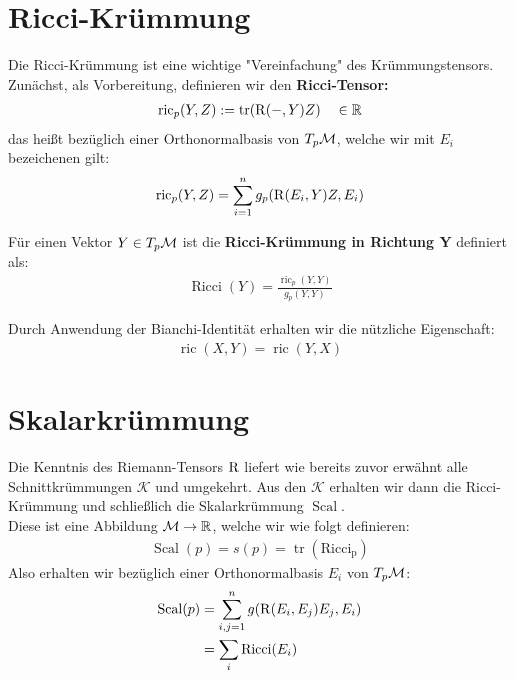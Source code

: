 \section{Ricci-Krümmung}
Die Ricci-Krümmung ist eine wichtige "Vereinfachung" des Krümmungstensors. \\
Zunächst, als Vorbereitung, definieren wir den \textbf{Ricci-Tensor:}
\begin{align}
	\operatorname{ric}_p(Y,Z) := \operatorname{tr}(\operatorname{R}(-, Y)Z) \quad \in \mathbb{R}
\end{align}
das heißt bezüglich einer Orthonormalbasis von $T_p\mathcal{M}$, welche wir mit $E_i$ bezeichenen gilt: 
\begin{align}
	\operatorname{ric}_p(Y,Z) = \sum_{i=1}^{n} g_p(\operatorname{R}(E_i,Y)Z,E_i)
\end{align}
\begin{defs}
	Für einen Vektor $Y \in T_p\mathcal{M}$ ist die \textbf{Ricci-Krümmung in Richtung Y} definiert als:
	\begin{align}
		\operatorname{Ricci}(Y) = \frac{\operatorname{ric}_p(Y,Y)}{g_p(Y,Y)}
	\end{align} 
\end{defs}
Durch Anwendung der Bianchi-Identität erhalten wir die nützliche Eigenschaft: 
\begin{align}
	\operatorname{ric}(X,Y) = \operatorname{ric}(Y,X)
\end{align}
\section{Skalarkrümmung}
Die Kenntnis des Riemann-Tensors $\operatorname{R}$ liefert 
wie bereits zuvor erwähnt alle Schnittkrümmungen $\mathcal{K}$ und umgekehrt. Aus den $\mathcal{K}$ erhalten wir dann die Ricci-Krümmung und schließlich die Skalarkrümmung $\operatorname{Scal}$. \\
Diese ist eine Abbildung $\mathcal{M} \rightarrow \mathbb{R}$, welche wir wie folgt definieren:
\begin{align}
	\operatorname{Scal}(p) = s(p) = \operatorname{tr}(\operatorname{Ricci_p}) 
\end{align} 
Also erhalten wir bezüglich einer Orthonormalbasis $E_i$ von $T_p\mathcal{M}$:
\begin{align}
	\operatorname{Scal}(p) &= \sum_{i,j = 1}^{n}g(\operatorname{R}(E_i,E_j)E_j,E_i) \nonumber \\
	&= \sum_{i}\operatorname{Ricci}(E_i)
\end{align}
